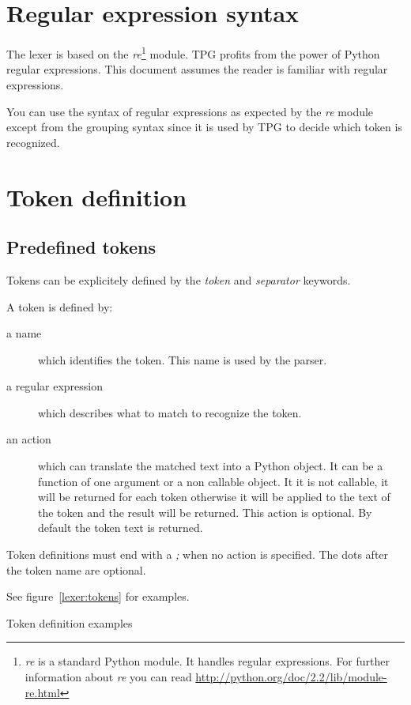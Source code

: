 \section{Regular expression syntax}

The lexer is based on the \emph{re}\footnote{\emph{re} is a standard Python module. It handles regular expressions. For further information about \emph{re} you can read \url{http://python.org/doc/2.2/lib/module-re.html}} module.
TPG profits from the power of Python regular expressions.
This document assumes the reader is familiar with regular expressions.

You can use the syntax of regular expressions as expected by the \emph{re} module except from the grouping syntax since it is used by TPG to decide which token is recognized.

\section{Token definition}									\label{lexer:token_def}

\subsection{Predefined tokens}

Tokens can be explicitely defined by the \emph{token} and \emph{separator} keywords.

A token is defined by:

\begin{description}
	\item [a name] which identifies the token.
		This name is used by the parser.
	\item [a regular expression] which describes what to match to recognize the token.
	\item [an action] which can translate the matched text into a Python object. It can be a function of one argument or a non callable object. It it is not callable, it will be returned for each token otherwise it will be applied to the text of the token and the result will be returned. This action is optional. By default the token text is returned.
\end{description}

Token definitions must end with a \emph{;} when no action is specified. The dots after the token name are optional.

See figure~\ref{lexer:tokens} for examples.

\begin{code}
\caption{Token definition examples}							\label{lexer:tokens}
\end{code}

